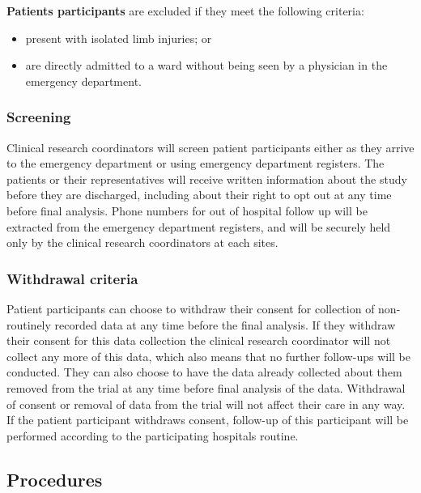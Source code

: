 \documentclass[
]{scrartcl}
\providecommand{\tightlist}{%
  \setlength{\itemsep}{0pt}\setlength{\parskip}{0pt}}\usepackage{longtable,booktabs,array}
\begin{document}
\textbf{Patients participants} are excluded if they meet the following
criteria:

\begin{itemize}
\tightlist
\item
  present with isolated limb injuries; or
\item
  are directly admitted to a ward without being seen by a physician in
  the emergency department.
\end{itemize}

\hypertarget{screening-2}{%
\subsubsection{Screening}\label{screening-2}}

Clinical research coordinators will screen patient participants either
as they arrive to the emergency department or using emergency department
registers. The patients or their representatives will receive written
information about the study before they are discharged, including about
their right to opt out at any time before final analysis. Phone numbers
for out of hospital follow up will be extracted from the emergency
department registers, and will be securely held only by the clinical
research coordinators at each sites.

\hypertarget{withdrawal-criteria}{%
\subsubsection{Withdrawal criteria}\label{withdrawal-criteria}}

Patient participants can choose to withdraw their consent for collection
of non-routinely recorded data at any time before the final analysis. If
they withdraw their consent for this data collection the clinical
research coordinator will not collect any more of this data, which also
means that no further follow-ups will be conducted. They can also choose
to have the data already collected about them removed from the trial at
any time before final analysis of the data. Withdrawal of consent or
removal of data from the trial will not affect their care in any way. If
the patient participant withdraws consent, follow-up of this participant
will be performed according to the participating hospitals routine.

\hypertarget{procedures}{%
\subsection{Procedures}\label{procedures}}
\end{document}
